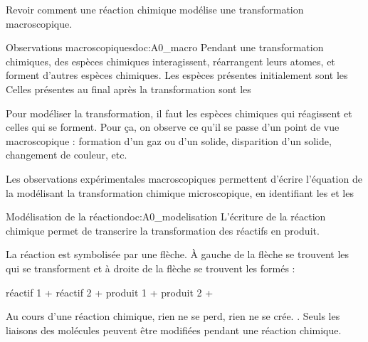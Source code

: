 \tetePremStssRedo

\vspace*{-40pt}

\begin{objectifs}
  \item Revoir comment une réaction chimique modélise une transformation macroscopique.
\end{objectifs}


\begin{doc}{Observations macroscopiques}{doc:A0_macro}
  Pendant une transformation chimiques, des espèces chimiques interagissent, réarrangent leurs atomes, et forment d'autres espèces chimiques.
  Les espèces présentes initialement sont les  Celles présentes au final après la transformation sont les 
  
  Pour modéliser la transformation, il faut  les espèces chimiques qui réagissent et celles qui se forment.
  Pour ça, on observe ce qu'il se passe d'un point de vue macroscopique : formation d'un gaz ou d'un solide, disparition d'un solide, changement de couleur, etc.
  
  \begin{encart}
    Les observations expérimentales macroscopiques permettent d'écrire l'équation de la  modélisant la transformation chimique microscopique, en identifiant les  et les 
  \end{encart}
\end{doc}

\begin{doc}{Modélisation de la réaction}{doc:A0_modelisation}
  L'écriture de la réaction chimique permet de transcrire la transformation des réactifs en produit.
  
  \begin{encart}
    La réaction est symbolisée par une flèche. À gauche de la flèche se trouvent les  qui se transforment et à droite de la flèche se trouvent les  formés :
    \begin{center}
      réactif 1 + réactif 2 +   \reaction produit 1 + produit 2 +  
    \end{center}
  \end{encart}
  
  Au cours d'une réaction chimique, rien ne se perd, rien ne se crée. .
  Seuls les liaisons des molécules peuvent être modifiées pendant une réaction chimique.
\end{doc}

